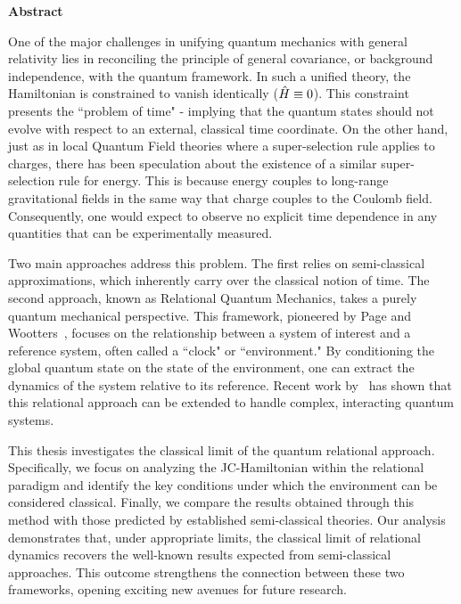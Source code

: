 \begin{center}
    {\Large\bfseries\sffamily Abstract}
\end{center}

One of the major challenges in unifying quantum mechanics with general relativity lies in reconciling the principle of general covariance, or background independence, with the quantum framework. In such a unified theory, the Hamiltonian is constrained to vanish identically ($\Hat{H} \equiv 0$). This constraint presents the ``problem of time" -  implying that the quantum states should not evolve with respect to an external, classical time coordinate.  On the other hand, just as in local Quantum Field theories where a super-selection rule applies to charges, there has been speculation about the existence of a similar super-selection rule for energy. This is because energy couples to long-range gravitational fields in the same way that charge couples to the Coulomb field. Consequently, one would expect to observe no explicit time dependence in any quantities that can be experimentally measured.

Two main approaches address this problem. The first relies on semi-classical approximations, which inherently carry over the classical notion of time. The second approach, known as Relational Quantum Mechanics, takes a purely quantum mechanical perspective. This framework, pioneered by Page and Wootters~\cite{page1983evolution}, focuses on the relationship between a system of interest and a reference system, often called a ``clock" or ``environment." By conditioning the global quantum state on the state of the environment, one can extract the dynamics of the system relative to its reference. Recent work by~\cite{Gemsheim:2023izg} has shown that this relational approach can be extended to handle complex, interacting quantum systems.

This thesis investigates the classical limit of the quantum relational approach. Specifically, we focus on analyzing the JC-Hamiltonian within the relational paradigm and identify the key conditions under which the environment can be considered classical. Finally, we compare the results obtained through this method with those predicted by established semi-classical theories. Our analysis demonstrates that, under appropriate limits, the classical limit of relational dynamics recovers the well-known results expected from semi-classical approaches. This outcome strengthens the connection between these two frameworks, opening exciting new avenues for future research.
\newpage